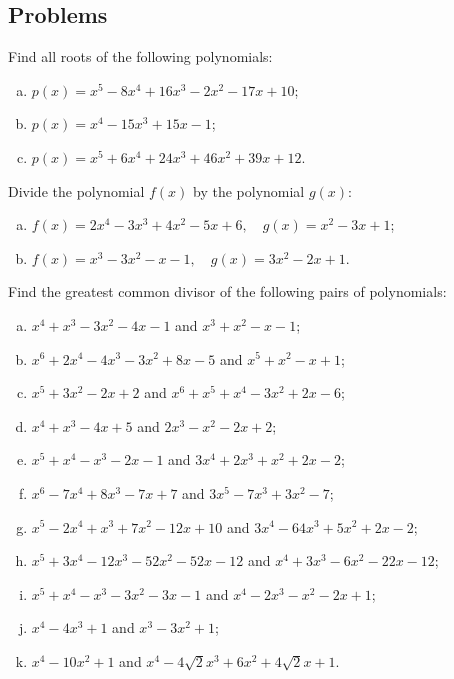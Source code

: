 \subsection{Problems}

\begin{problem}
    Find all roots of the following polynomials:
    
    \begin{enumerate}[a) ]
    \item $p(x) = x^5 - 8 x^4 + 16 x^3 - 2 x^2 - 17 x + 10$;
    
    \item $p(x) = x^4 - 15 x^3 + 15 x - 1$;
    
    \item $p(x) = x^5 + 6 x^4 + 24 x^3 + 46 x^2 + 39 x + 12$.
    \end{enumerate}
\end{problem}

\begin{problem}
Divide the polynomial $f(x)$ by the polynomial $g(x)$:
\begin{enumerate}[a) ]
\item $f(x)=2 x^4-3 x^3+4 x^2-5 x+6, \quad g(x)=x^2-3 x+1$;
\item $f(x)=x^3-3 x^2-x-1, \quad g(x)=3 x^2-2 x+1$.
\end{enumerate}
\end{problem}

\begin{problem}
Find the greatest common divisor of the following pairs of polynomials:
\begin{enumerate}[a) ]
\item $x^4+x^3-3 x^2-4 x-1$ and $x^3+x^2-x-1$;
\item $x^6+2 x^4-4 x^3-3 x^2+8 x-5$ and $x^5+x^2-x+1$;
\item $x^5+3 x^2-2 x+2$ and $x^6+x^5+x^4-3 x^2+2 x-6$;
\item $x^4+x^3-4 x+5$ and $2 x^3-x^2-2 x+2$;
\item $x^5+x^4-x^3-2 x-1$ and $3 x^4+2 x^3+x^2+2 x-2$;
\item $x^6-7 x^4+8 x^3-7 x+7$ and $3 x^5-7 x^3+3 x^2-7$;
\item $x^5-2 x^4+x^3+7 x^2-12 x+10$ and $3 x^4-64 x^3+5 x^2+2 x-2$;
\item $x^5+3 x^4-12 x^3-52 x^2-52 x-12$ and $x^4+3 x^3-6 x^2-22 x-12$;
\item $x^5+x^4-x^3-3 x^2-3 x-1$ and $x^4-2 x^3-x^2-2 x+1$;
\item $x^4-4 x^3+1$ and $x^3-3 x^2+1$;
\item $x^4-10 x^2+1$ and $x^4-4 \sqrt{2} x^3+6 x^2+4 \sqrt{2} x+1$.
\end{enumerate}
\end{problem}


